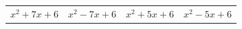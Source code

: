 {\begin{tabular}[t]{|l|l|l|l|}
     \tabularnewline\cline{1-1}\cline{2-2}\cline{3-3}\cline{4-4}
                ${x}^{2}+7x+6$
               &
                ${x}^{2}-7x+6$
               &
                \uline{
                  ${x}^{2}+5x+6$
                }
               &
                ${x}^{2}-5x+6$
     \tabularnewline\cline{1-1}\cline{2-2}\cline{3-3}\cline{4-4}
    \end{tabular}} %
